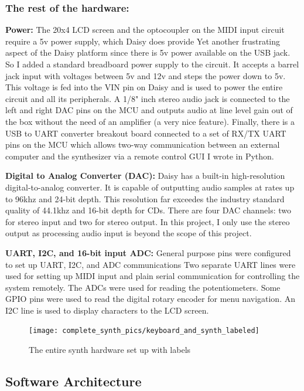 \documentclass[acmlarge,screen]{acmart}
\begin{document}
	\subsubsection{The rest of the hardware:}
	\textbf{Power:}
	The 20x4 LCD screen and the optocoupler on the MIDI input circuit require a 5v power supply, which Daisy does provide Yet another frustrating aspect of the Daisy platform since there is 5v power available on the USB jack. So I added a standard breadboard power supply to the circuit. It accepts a barrel jack input with voltages between 5v and 12v and steps the power down to 5v. This voltage is fed into the VIN pin on Daisy and is used to power the entire circuit and all its peripherals. A 1/8" inch stereo audio jack is connected to the left and right DAC pins on the MCU and outputs audio at line level gain out of the box without the need of an amplifier (a very nice feature). Finally, there is a USB to UART converter breakout board connected to a set of RX/TX UART pins on the MCU which allows two-way communication between an external computer and the synthesizer via a remote control GUI I wrote in Python.
	
	\textbf{Digital to Analog Converter (DAC):} 
	Daisy has a built-in high-resolution digital-to-analog converter. It is capable of outputting audio samples at rates up to 96khz and 24-bit depth. This resolution far exceedes the industry standard quality of 44.1khz and 16-bit depth for CDs. There are four DAC channels: two for stereo input and two for stereo output. In this project, I only use the stereo output as processing audio input is beyond the scope of this project.

	\textbf{UART, I2C, and 16-bit input ADC:}
	General purpose pins were configured to set up UART, I2C, and ADC communications Two separate UART lines were used for setting up MIDI input and plain serial communication for controlling the system remotely. The ADCs were used for reading the potentiometers. Some GPIO pins were used to read the digital rotary encoder for menu navigation. An I2C line is used to display characters to the LCD screen.

	\begin{figure}[H]
		\texttt{[image: complete\_synth\_pics/keyboard\_and\_synth\_labeled]}
		\caption{The entire synth hardware set up with labels}
		\centering
	\end{figure}

\subsection{Software Architecture}
	
\end{document}
